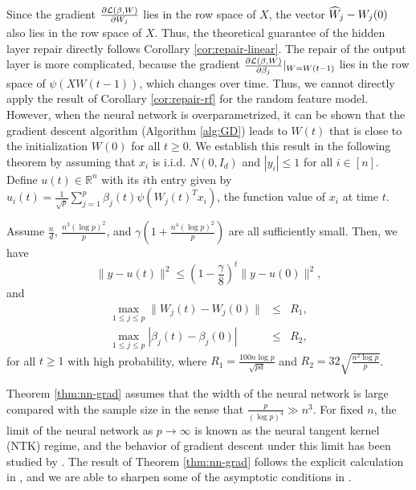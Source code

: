 Since the gradient $\frac{\partial {\mathcal L}(\beta,W)}{\partial W_j}$ lies in the row space of $X$, the vector $\widehat{W}_j-W_j(0)$ also lies in the row space of $X$. Thus, the theoretical guarantee of the hidden layer repair directly follows
Corollary \ref{cor:repair-linear}.
The repair of the output layer is more complicated, because the gradient $\frac{\partial {\mathcal L}(\beta,W)}{\partial \beta_j}|_{W=W(t-1)}$ lies in the row space of $\psi(XW(t-1))$, which changes over time. Thus, we cannot directly apply the result of Corollary \ref{cor:repair-rf} for the random feature model. However, when the neural network is overparametrized, it can be shown that the gradient descent algorithm (Algorithm \ref{alg:GD}) leads to $W(t)$ that is close to the initialization $W(0)$ for all $t\geq 0$. We establish this result in the following theorem by assuming that $x_i$ is i.i.d. $N(0,I_d)$ and $|y_i|\leq 1$ for all $i\in[n]$. Define $u(t)\in\mathbb{R}^n$ with its $i$th entry given by
$u_i(t)=\frac{1}{\sqrt{p}}\sum_{j=1}^p\beta_j(t)\psi(W_j(t)^Tx_i)$, the function value of $x_i$ at time $t$.
\vskip10pt
\begin{thm}\label{thm:nn-grad}
Assume $\frac{n}{d}$, $\frac{n^3(\log p)^2}{p}$, and $\gamma\left(1+\frac{n^4(\log p)^2}{p}\right)$ are all sufficiently small. Then, we have
\begin{equation}
\|y-u(t)\|^2 \leq \left(1-\frac{\gamma}{8}\right)^t\|y-u(0)\|^2, \label{eq:iter-function}
\end{equation}
and
\begin{eqnarray}
\label{eq:iter-parameter} \max_{1\leq j\leq p}\|W_j(t)-W_j(0)\| &\leq& R_1, \\
\label{eq:iter-parameter-beta} \max_{1\leq j\leq p}|\beta_j(t)-\beta_j(0)| &\leq& R_2,
\end{eqnarray}
for all $t\geq 1$ with high probability, where $R_1=\frac{100n\log p}{\sqrt{pd}}$ and $R_2=32\sqrt{\frac{n^2\log p}{p}}$.
\end{thm}

Theorem \ref{thm:nn-grad} assumes that the width of the neural network is large compared with the sample size in the sense that $\frac{p}{(\log p)^4}\gg n^3$. For fixed $n$, the limit of the neural network as $p\rightarrow\infty$ is known as the neural tangent kernel (NTK) regime, and the behavior of gradient descent under this limit has been studied by \cite{jacot2018neural}. The result of Theorem \ref{thm:nn-grad} follows the explicit calculation in \cite{du2018gradient}, and we are able to sharpen some of the asymptotic conditions in \cite{du2018gradient}.

